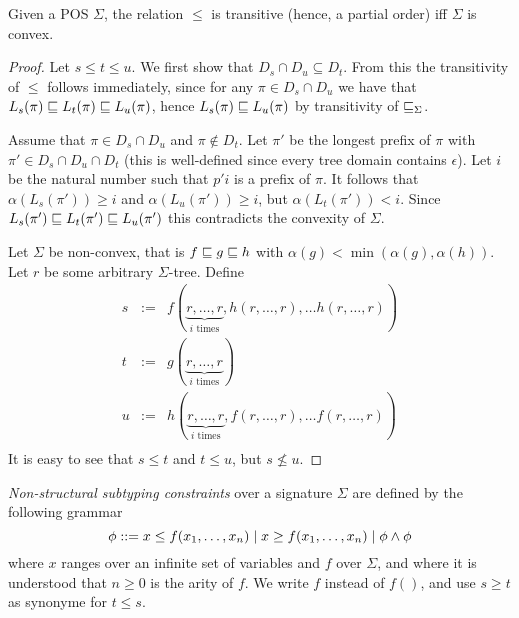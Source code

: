 \begin{lemma}
  Given a POS $\Sigma$, the relation $\leq$ is transitive (hence, a
  partial order) iff $\Sigma$ is convex.
\end{lemma}
\begin{proof}
  Let $s \leq t \leq u$. We first show that $D_s \cap D_u \subseteq
  D_t$. From this the transitivity of $\leq$ follows immediately,
  since for any $\pi\in D_s \cap D_u$ we have that $L_s(\pi) \sqsubseteq
  L_t(\pi) \sqsubseteq L_u(\pi)$, hence $L_s(\pi) \sqsubseteq L_u(\pi)$ by
  transitivity of $\sqsubseteq_\Sigma$.

  Assume that $\pi \in D_s \cap D_u$ and $\pi \not\in D_t$. Let $\pi'$
  be the longest prefix of $\pi$ with $\pi'\in D_s \cap D_u \cap D_t$
  (this is well-defined since every tree domain contains
  $\epsilon$). Let $i$ be the natural number such that $p'i$ is a
  prefix of $\pi$. It follows that $\alpha(L_s(\pi')) \geq i$ and
  $\alpha(L_u(\pi')) \geq i$, but $\alpha(L_t(\pi')) < i$. Since
  $L_s(\pi') \sqsubseteq L_t(\pi') \sqsubseteq L_u(\pi')$ this contradicts the
  convexity of $\Sigma$.

  Let $\Sigma$ be non-convex, that is $f \sqsubseteq g \sqsubseteq h$ with
  $\alpha(g) < \min(\alpha(g),\alpha(h))$. Let $r$ be some arbitrary
  $\Sigma$-tree. Define
  \begin{eqnarray*}
    s & := & f(\underbrace{r,\ldots,r}_{i \mbox
      { times}},h(r,\ldots,r),\ldots h(r,\ldots,r))\\
    t & := & g(\underbrace{r,\ldots,r}_{i \mbox
      { times}})\\
    u & := & h(\underbrace{r,\ldots,r}_{i \mbox
      { times}},f(r,\ldots,r),\ldots f(r,\ldots,r))\\
  \end{eqnarray*}
  It is easy to see that $s \leq t$ and $t \leq u$, but $s \not\leq u$.
\end{proof}

\emph{Non-structural subtyping constraints} over a signature $\Sigma$
are defined by the following grammar
\[
\phi ::= x \leq f(x_1,\ldots,x_n) \mid x \geq f(x_1,\ldots,x_n) \mid
\phi \wedge \phi
\]
where $x$ ranges over an infinite set of variables and $f$ over
$\Sigma$, and where it is understood that $n \geq 0$ is the arity of
$f$.  We write $f$ instead of $f()$, and use $s \geq t$ as synonyme for
$t \leq s$.

